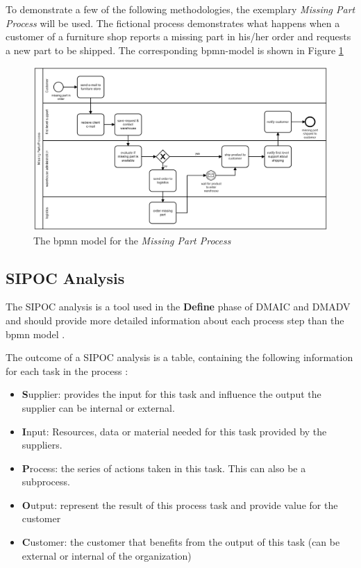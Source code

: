 To demonstrate a few of the following methodologies, the exemplary \textit{Missing Part Process} will be used. The fictional process demonstrates what happens when a customer of a furniture shop reports a missing part in his/her order and requests a new part to be shipped. The corresponding \gls{bpmn}-model is shown in Figure \ref{fig:missing-part-process}

\begin{figure}[H]
	\centering
	\includegraphics[width=1\columnwidth]{processes/missing-parts-process/missing-parts-process}
	\caption{The \gls{bpmn} model for the \textit{Missing Part Process}} 
	\label{fig:missing-part-process} 
\end{figure}

\subsection{SIPOC Analysis}
The SIPOC analysis is a tool used in the \textbf{Define} phase of \gls{DMAIC} and \gls{DMADV} and should provide more detailed information about each process step than the \gls{bpmn} model  \cite{vom2014handbook}. 

The outcome of a SIPOC analysis is a table, containing the following information for each task in the process \cite{toutenburg2008six}: 
\begin{itemize}
	\item \textbf{S}upplier: provides the input for this task and influence the output the supplier can be internal or external. 
	\item \textbf{I}nput: Resources, data or material needed for this task provided by the suppliers. 
	\item \textbf{P}rocess: the series of actions taken in this task. This can also be a subprocess. 
	\item \textbf{O}utput: represent the result of this process task and provide value for the customer
	\item \textbf{C}ustomer: the customer that benefits from the output of this task (can be external or internal of the organization)
\end{itemize}

